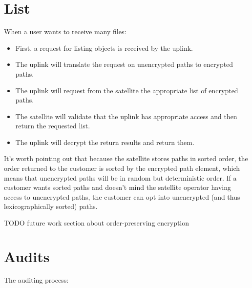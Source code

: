 \documentclass[11pt,fleqn,openany]{book}
\newcommand{\todo}[1]{{\color{red} TODO #1 }}
\begin{document}
\section{List}

When a user wants to receive many files:

\begin{itemize}
\item First, a request for listing objects is received by the uplink.
\item The uplink will translate the request on unencrypted paths to encrypted
  paths.
\item The uplink will request from the satellite the appropriate list of
  encrypted paths.
\item The satellite will validate that the uplink has appropriate access
  and then return the requested list.
\item The uplink will decrypt the return results and return them.
\end{itemize}

It's worth pointing out that because the satellite stores paths in sorted
order, the order returned to the customer is sorted by the encrypted
path element, which means that unencrypted paths will be in random but
deterministic order. If a customer wants sorted paths and doesn't mind the
satellite operator having access to unencrypted paths, the customer can opt
into unencrypted (and thus lexicographically sorted) paths.

\todo{future work section about order-preserving encryption}

\section{Audits}

The auditing process:
\end{document}
